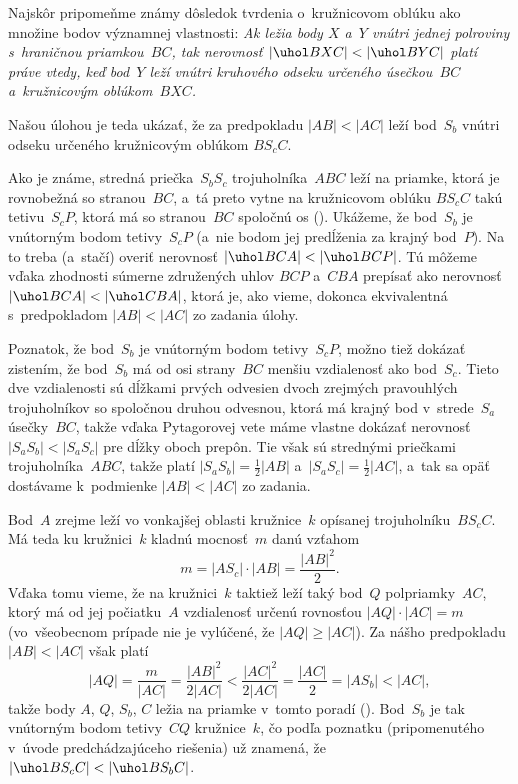 {%
Najskôr pripomeňme známy dôsledok tvrdenia o~kružnicovom oblúku
ako množine bodov významnej vlastnosti:
{\sl Ak ležia body $X$ a~$Y$ vnútri jednej polroviny
s~hraničnou priamkou~$BC$, tak nerovnosť $|\uhol BXC|<|\uhol BYC|$ platí
práve vtedy, keď bod~$Y$ leží vnútri kruhového odseku určeného úsečkou~$BC$
a~kružnicovým oblúkom~$BXC$.}

Našou úlohou je teda ukázať, že za predpokladu $|AB|<|AC|$ leží
bod~$S_b$ vnútri odseku určeného kružnicovým oblúkom $BS_cC$.

Ako je známe, stredná priečka~$S_bS_c$ trojuholníka~$ABC$ leží na priamke, ktorá
je rovnobežná so stranou~$BC$, a~tá preto vytne na kružnicovom
oblúku $BS_cC$ takú tetivu~$S_cP$, ktorá má so stranou~$BC$
spoločnú os (\obr). Ukážeme, že bod~$S_b$ je vnútorným bodom
tetivy~$S_cP$ (a~nie bodom jej predĺženia za krajný bod~$P$). Na to
treba (a~stačí) overiť nerovnosť $|\uhol BCA|<|\uhol BCP|$.
Tú môžeme vďaka zhodnosti súmerne združených
uhlov $BCP$ a~$CBA$ prepísať ako nerovnosť $|\uhol BCA|<|\uhol CBA|$,
ktorá je, ako vieme, dokonca ekvivalentná
s~predpokladom $|AB|<|AC|$ zo zadania úlohy.

\poznamka
Poznatok, že bod~$S_b$ je vnútorným bodom tetivy~$S_cP$, možno tiež dokázať zistením, že bod~$S_b$ má od osi strany~$BC$
menšiu vzdialenosť ako bod~$S_c$. Tieto dve vzdialenosti sú
dĺžkami prvých odvesien dvoch zrejmých pravouhlých trojuholníkov so spoločnou druhou
odvesnou, ktorá má krajný bod v~strede~$S_a$ úsečky~$BC$,
takže vďaka Pytagorovej vete máme vlastne dokázať nerovnosť
$|S_aS_b|<|S_aS_c|$ pre dĺžky oboch prepôn. Tie však sú strednými
priečkami trojuholníka~$ABC$, takže platí $|S_aS_b|=\frac12|AB|$
a~$|S_aS_c|=\frac12|AC|$, a~tak sa opäť dostávame k~podmienke
$|AB|<|AC|$ zo zadania.
%

\ineres
Bod~$A$ zrejme leží vo vonkajšej oblasti kružnice~$k$ opísanej trojuholníku~$BS_cC$.
Má teda ku kružnici~$k$ kladnú mocnosť~$m$ danú vzťahom
$$
m=|AS_c|\cdot |AB|=\frac{|AB|^2}{2}.
$$
Vďaka tomu vieme, že na kružnici~$k$ taktiež leží taký
bod~$Q$ polpriamky~$AC$, ktorý má od
jej počiatku~$A$ vzdialenosť určenú rovnosťou $|AQ|\cdot|AC|=m$
(vo~všeobecnom prípade nie je vylúčené, že $|AQ|\ge|AC|$). Za nášho
predpokladu $|AB|<|AC|$ však platí
$$
|AQ|=\frac{m}{|AC|}=\frac{|AB|^2}{2|AC|}<\frac{|AC|^2}{2|AC|}=
\frac{|AC|}{2}=|AS_b|<|AC|,
$$
takže body $A$, $Q$, $S_b$, $C$ ležia na priamke v~tomto poradí
(\obr). Bod~$S_b$ je tak vnútorným bodom tetivy~$CQ$ kružnice~$k$, čo podľa poznatku (pripomenutého v~úvode predchádzajúceho riešenia)
už znamená, že $|\uhol BS_cC|<|\uhol BS_bC|$.


}
